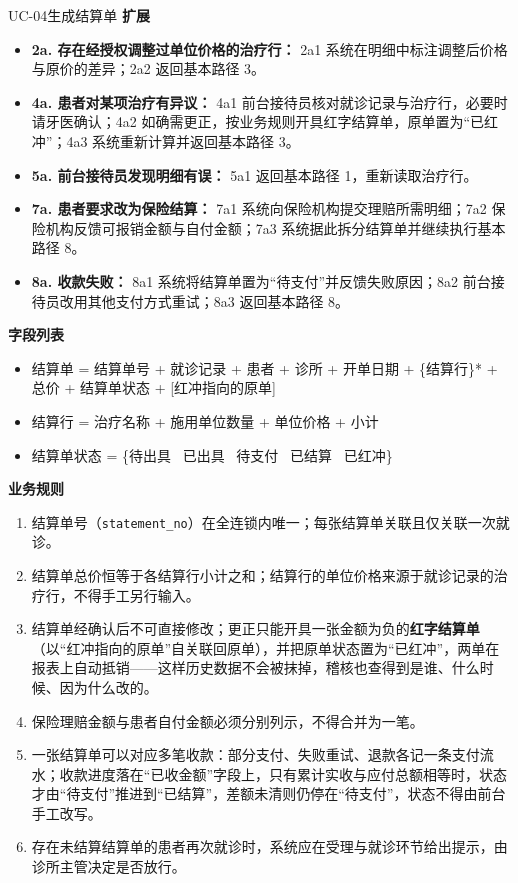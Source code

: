\documentclass[11pt,a4paper]{ctexart}
\begin{document}
\begin{ucbox}{UC-04\quad 生成结算单}
\vspace{2pt}
\textbf{扩展}
\begin{itemize}[leftmargin=1.4em,topsep=2pt,itemsep=1pt]
  \item \textbf{2a. 存在经授权调整过单位价格的治疗行：} 2a1 系统在明细中标注调整后价格与原价的差异；2a2 返回基本路径 3。
  \item \textbf{4a. 患者对某项治疗有异议：} 4a1 前台接待员核对就诊记录与治疗行，必要时请牙医确认；4a2 如确需更正，按业务规则开具红字结算单，原单置为“已红冲”；4a3 系统重新计算并返回基本路径 3。
  \item \textbf{5a. 前台接待员发现明细有误：} 5a1 返回基本路径 1，重新读取治疗行。
  \item \textbf{7a. 患者要求改为保险结算：} 7a1 系统向保险机构提交理赔所需明细；7a2 保险机构反馈可报销金额与自付金额；7a3 系统据此拆分结算单并继续执行基本路径 8。
  \item \textbf{8a. 收款失败：} 8a1 系统将结算单置为“待支付”并反馈失败原因；8a2 前台接待员改用其他支付方式重试；8a3 返回基本路径 8。
\end{itemize}

\vspace{2pt}
\textbf{字段列表}
\begin{itemize}[leftmargin=1.4em,topsep=2pt,itemsep=1pt]
  \item 结算单 = 结算单号 + 就诊记录 + 患者 + 诊所 + 开单日期 + \{结算行\}* + 总价 + 结算单状态 + [红冲指向的原单]
  \item 结算行 = 治疗名称 + 施用单位数量 + 单位价格 + 小计
  \item 结算单状态 = \{待出具 \textbar\ 已出具 \textbar\ 待支付 \textbar\ 已结算 \textbar\ 已红冲\}
\end{itemize}

\vspace{2pt}
\textbf{业务规则}
\begin{enumerate}[leftmargin=1.9em,topsep=2pt,itemsep=1pt]
  \item 结算单号（\texttt{statement\_no}）在全连锁内唯一；每张结算单关联且仅关联一次就诊。
  \item 结算单总价恒等于各结算行小计之和；结算行的单位价格来源于就诊记录的治疗行，不得手工另行输入。
  \item 结算单经确认后不可直接修改；更正只能开具一张金额为负的\textbf{红字结算单}（以“红冲指向的原单”自关联回原单），并把原单状态置为“已红冲”，两单在报表上自动抵销——这样历史数据不会被抹掉，稽核也查得到是谁、什么时候、因为什么改的。
  \item 保险理赔金额与患者自付金额必须分别列示，不得合并为一笔。
  \item 一张结算单可以对应多笔收款：部分支付、失败重试、退款各记一条支付流水；收款进度落在“已收金额”字段上，只有累计实收与应付总额相等时，状态才由“待支付”推进到“已结算”，差额未清则仍停在“待支付”，状态不得由前台手工改写。
  \item 存在未结算结算单的患者再次就诊时，系统应在受理与就诊环节给出提示，由诊所主管决定是否放行。
\end{enumerate}


\end{ucbox}
\end{document}
